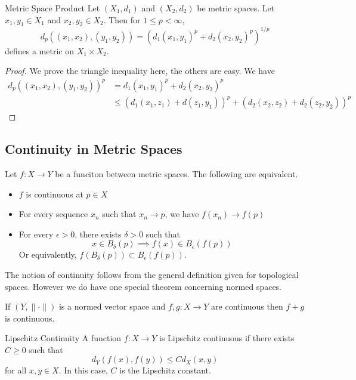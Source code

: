\begin{prp}{Metric Space Product}{} Let $(X_1,d_1)$ and $(X_2,d_2)$ be metric spaces. Let $x_1,y_1\in X_1$ and $x_2,y_2\in X_2$. Then for $1\leq p<\infty$, $$d_p((x_1,x_2),(y_1,y_2))=(d_1(x_1,y_1)^p+d_2(x_2,y_2)^p)^{1/p}$$ defines a metric on $X_1\times X_2$. \tcbline
\begin{proof}
We prove the triangle inequality here, the others are easy. We have
\begin{align*}
d_p((x_1,x_2),(y_1,y_2))^p&=d_1(x_1,y_1)^p+d_2(x_2,y_2)^p\\
&\leq(d_1(x_1,z_1)+d(z_1,y_1))^p+(d_2(x_2,z_2)+d_2(z_2,y_2))^p
\end{align*}
\end{proof}
\end{prp}

\subsection{Continuity in Metric Spaces}
\begin{prp}{}{} Let $f:X\to Y$ be a funciton between metric spaces. The following are equivalent. 
\begin{itemize}
\item $f$ is continuous at $p\in X$
\item For every sequence $x_n$ such that $x_n\to p$, we have $f(x_n)\to f(p)$
\item For every $\epsilon>0$, there exists $\delta>0$ such that $$x\in B_{\delta}(p)\implies f(x)\in B_{\epsilon}(f(p))$$ Or equivalently, $f(B_{\delta}(p))\subset B_{\epsilon}(f(p))$. 
\end{itemize}
\end{prp}

The notion of continuity follows from the general definition given for topological spaces. However we do have one special theorem concerning normed spaces. 

\begin{prp}{}{} If $(Y,\|\cdot\|)$ is a normed vector space and $f,g:X\to Y$ are continuous then $f+g$ is continuous. 
\end{prp}

\begin{defn}{Lipschitz Continuity}{} A function $f:X\to Y$ is Lipschitz continuous if there exists $C\geq 0$ such that $$d_Y(f(x),f(y))\leq Cd_X(x,y)$$ for all $x,y\in X$. In this case, $C$ is the Lipschitz constant. 
\end{defn}

